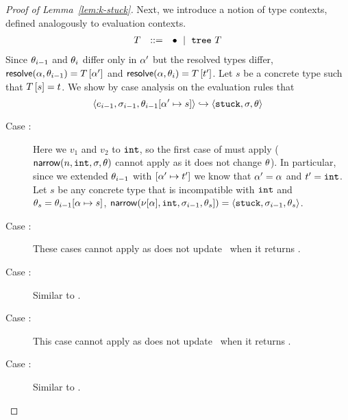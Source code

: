 \begin{proof}[Proof of Lemma~\ref{lem:k-stuck}]
  Next, we introduce a notion of type %
  contexts, defined
  analogously to evaluation contexts.
  $$
  \begin{array}{lcl}
    T &::=& \bullet \ \mid \  \mathtt{tree}\ T \\
  \end{array}
  $$
  Since $\theta_{i-1}$ and $\theta_{i}$ differ only in $\alpha'$ but the resolved
  types differ,
  $\mathsf{resolve}(\alpha, \theta_{i-1}) = T\left[\alpha'\right]$
  and
  $\mathsf{resolve}(\alpha, \theta_{i}) = T\left[t'\right]$.
  Let $s$ be a concrete type such that $T\left[s\right] = t$.
  We show by case analysis on the evaluation rules that
  $$\langle e_{i-1}, \sigma_{i-1}, \theta_{i-1}[\alpha' \mapsto s] \rangle \hookrightarrow \langle \mathtt{stuck}, \sigma, \theta \rangle$$
    \begin{description}
    \item[Case \replusgood:]
      Here we \forcesym $v_1$ and $v_2$ to $\mathtt{int}$, so the first case of
      \forcesym must apply ($\mathsf{narrow}(n, \mathtt{int}, \sigma, \theta)$ cannot apply
      as it does not change $\theta$).
      In particular, since we extended $\theta_{i-1}$ with
      $[\alpha' \mapsto t']$ we know that $\alpha' = \alpha$ and
      $t' = \mathtt{int}$.
      Let $s$ be any concrete type that is incompatible with $\mathtt{int}$
      and $\theta_s = \theta_{i-1}[\alpha \mapsto s]$,
      $\mathsf{narrow}(\nu[\alpha], \mathtt{int}, \sigma_{i-1}, \theta_s]) = \langle \mathtt{stuck}, \sigma_{i-1}, \theta_s \rangle$.
    \item[Case :]
      These cases cannot apply as \forcesym does not update \tsu\ when
      it returns \stuck.
    \item[Case :]
      Similar to \replusgood.
    \item[Case \reifbad:]
      This case cannot apply as \forcesym does not update \tsu\ when
      it returns \stuck.
    \item[Case \reappgood:]
      Similar to \replusgood.

\end{description}
\end{proof}
